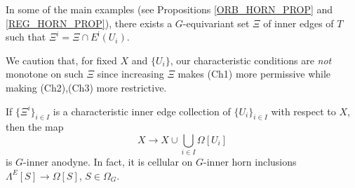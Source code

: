 \documentclass[a4paper,10pt,draft]{article}%
\begin{document}
\begin{remark}\label{SOMEMAIN REM}
In some of the main examples (see Propositions \ref{ORB_HORN_PROP} and \ref{REG_HORN_PROP}), there exists a $G$-equivariant set 
$\Xi$ of inner edges of $T$ such that $\Xi^i = \Xi \cap E^{\mathsf{i}}(U_i)$.

	
We caution that, for fixed $X$ and $\{U_i\}$, our characteristic conditions are \textit{not} monotone on such $\Xi$ since increasing $\Xi$ makes (Ch1) more permissive while making (Ch2),(Ch3) more restrictive.
\end{remark}


\begin{lemma}\label{CHAREDGE LEM}
If $\{\Xi^i\}_{i \in I}$ is a characteristic inner edge collection of $\{U_i\}_{i\in I}$ with respect to $X$, then the map
	\begin{equation}\label{CHARLEM EQ}
		X \to X \cup \bigcup_{i \in I} \Omega[U_i]
	\end{equation}
is $G$-inner anodyne. In fact, it is cellular on $G$-inner horn inclusions $\Lambda^E[S] \to \Omega[S]$, $S \in \Omega_G$.
\end{lemma}
\end{document}
